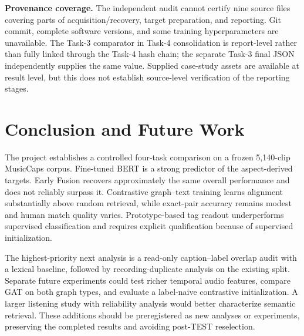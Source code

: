 \documentclass[conference]{IEEEtran}
\begin{document}
\textbf{Provenance coverage.} The independent audit cannot certify nine source files covering parts of acquisition/recovery, target preparation, and reporting. Git commit, complete software versions, and some training hyperparameters are unavailable. The Task-3 comparator in Task-4 consolidation is report-level rather than fully linked through the Task-4 hash chain; the separate Task-3 final JSON independently supplies the same value. Supplied case-study assets are available at result level, but this does not establish source-level verification of the reporting stages.

\section{Conclusion and Future Work}\label{sec:conclusion}
The project establishes a controlled four-task comparison on a frozen 5,140-clip MusicCaps corpus. Fine-tuned BERT is a strong predictor of the aspect-derived targets. Early Fusion recovers approximately the same overall performance and does not reliably surpass it. Contrastive graph--text training learns alignment substantially above random retrieval, while exact-pair accuracy remains modest and human match quality varies. Prototype-based tag readout underperforms supervised classification and requires explicit qualification because of supervised initialization.

The highest-priority next analysis is a read-only caption--label overlap audit with a lexical baseline, followed by recording-duplicate analysis on the existing split. Separate future experiments could test richer temporal audio features, compare GAT on both graph types, and evaluate a label-naive contrastive initialization. A larger listening study with reliability analysis would better characterize semantic retrieval. These additions should be preregistered as new analyses or experiments, preserving the completed results and avoiding post-TEST reselection.




\clearpage
\onecolumn
\appendices
\end{document}
